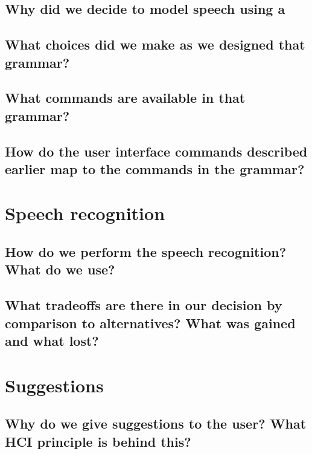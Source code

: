 \documentclass[]{article}
\begin{document}
\subsection{Why did we decide to model speech using a} %

\subsection{What choices did we make as we designed that grammar?}

\subsection{What commands are available in that grammar?}

\subsection{How do the user interface commands described earlier map to the commands in the grammar?  }

\section{Speech recognition}

\subsection{How do we perform the speech recognition? What do we use?}

\subsection{What tradeoffs are there in our decision by comparison to alternatives? What was gained and what lost?}

\clearpage

\section{Suggestions}

\subsection{Why do we give suggestions to the user? What HCI principle is behind this?}

\end{document}
